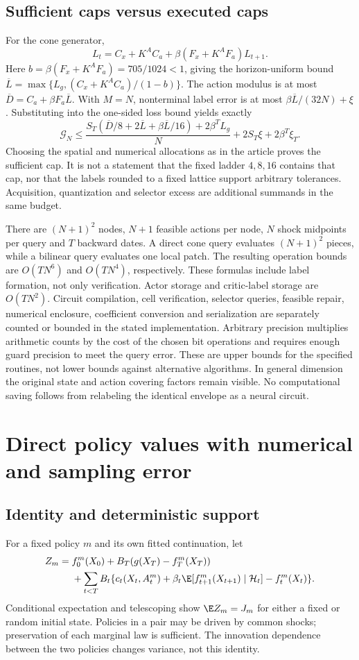 \subsection{Sufficient caps versus executed caps}
For the cone generator,
\[
 L_t=C_x+K^AC_a+\beta(F_x+K^AF_a)L_{t+1}.
\]
Here $b=\beta(F_x+K^AF_a)=705/1024<1$, giving the horizon-uniform bound $\overline L=\max\{L_g,(C_x+K^AC_a)/(1-b)\}$. The action modulus is at most $\overline D=C_a+\beta F_a\overline L$. With $M=N$, nonterminal label error is at most $\beta\overline L/(32N)+\xi$. Substituting into the one-sided loss bound yields exactly
\[
 \mathcal G_N\le\frac{S_T(\overline D/8+2\overline L+\beta\overline L/16)+2\beta^TL_g}{N}
                      +2S_T\xi+2\beta^T\xi_T.
\]
Choosing the spatial and numerical allocations as in the article proves the sufficient cap. It is not a statement that the fixed ladder $4,8,16$ contains that cap, nor that the labels rounded to a fixed lattice support arbitrary tolerances. Acquisition, quantization and selector excess are additional summands in the same budget.

There are $(N+1)^2$ nodes, $N+1$ feasible actions per node, $N$ shock midpoints per query and $T$ backward dates. A direct cone query evaluates $(N+1)^2$ pieces, while a bilinear query evaluates one local patch. The resulting operation bounds are $O(TN^6)$ and $O(TN^4)$, respectively. These formulas include label formation, not only verification. Actor storage and critic-label storage are $O(TN^2)$. Circuit compilation, cell verification, selector queries, feasible repair, numerical enclosure, coefficient conversion and serialization are separately counted or bounded in the stated implementation. Arbitrary precision multiplies arithmetic counts by the cost of the chosen bit operations and requires enough guard precision to meet the query error. These are upper bounds for the specified routines, not lower bounds against alternative algorithms. In general dimension the original state and action covering factors remain visible. No computational saving follows from relabeling the identical envelope as a neural circuit.

\section{Direct policy values with numerical and sampling error}\label{supp:direct47}
\subsection{Identity and deterministic support}
For a fixed policy $m$ and its own fitted continuation, let
\begin{align*}
 Z_m={}&f_0^m(X_0)+B_T(g(X_T)-f_T^m(X_T))\\
 &+\sum_{t<T}B_t\{c_t(X_t,A_t^m)+\beta_t\E[f_{t+1}^m(X_{t+1})\mid\mathcal H_t]-f_t^m(X_t)\}.
\end{align*}
Conditional expectation and telescoping show $\E Z_m=J_m$ for either a fixed or random initial state. Policies in a pair may be driven by common shocks; preservation of each marginal law is sufficient. The innovation dependence between the two policies changes variance, not this identity.

